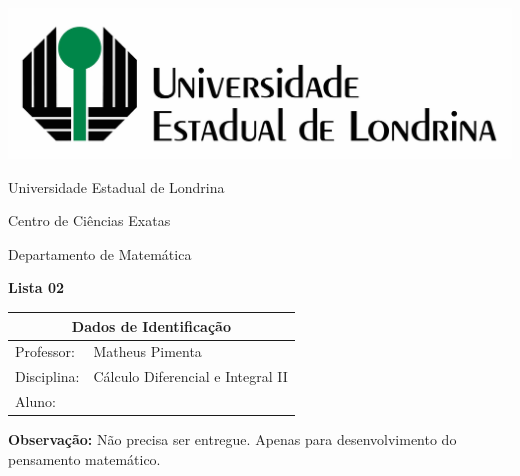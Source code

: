 \documentclass[oneside,a4paper,12pt]{article}
\newcommand{\universidade}{Universidade Estadual de Londrina}
\newcommand{\centro}{Centro de Ciências Exatas}
\newcommand{\departamento}{Departamento de Matemática}
\newcommand{\curso}{Ciência da Computação}
\newcommand{\professores}{Matheus Pimenta}
\newcommand{\disciplina}{Cálculo Diferencial e Integral II}
\begin{document}
	\pagestyle{empty}
	
	\begin{center}
		\includegraphics[width=\linewidth/2]{logo.jpg}%
	 	\vspace{2pt} 	
		
		\universidade
		\par
		\centro
		\par
		\departamento
		\par
		\par
		\vspace{12pt}
		\LARGE \textbf{Lista 02}
		
	\end{center}
	
	\vspace{12pt}
	
	\begin{tabular}{ |l|p{12cm}| }
		
		\hline
		\multicolumn{2}{|c|}{\textbf{Dados de Identificação}} \\
		\hline
		Professor:         &    \professores           \\
		\hline
		Disciplina:        &    \disciplina          \\
		\hline
		Aluno:             &                   \\
		\hline
		
	\end{tabular}
	\vspace{6pt}
	
	{\bf Observação:} Não precisa ser entregue. Apenas para desenvolvimento do pensamento matemático.
	
	\begin{snugshade}
	\end{snugshade}
\end{document}
